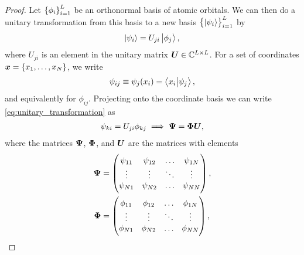             \begin{proof}
                Let $\left\{ \phi_i \right\}_{i = 1}^{L}$ be an orthonormal basis of
                atomic orbitals.
                We can then do a unitary transformation from this basis to a new
                basis $\left\{ \ket{\psi_i} \right\}_{i = 1}^{L}$ by
                \begin{align}
                    \ket{\psi_i} = U_{ji}\ket{\phi_j},
                    \label{eq:unitary_transformation}
                \end{align}
                where $U_{ji}$ is an element in the unitary matrix $\boldsymbol{U} \in
                \mathbb{C}^{L \times L}$.
                For a set of coordinates $\boldsymbol{x} = \left\{ x_1, \dots, x_N \right\}$, we
                write
                \begin{align}
                    \psi_{ij} \equiv \psi_j(x_i)
                    = \braket{x_i}{\psi_j},
                \end{align}
                and equivalently for $\phi_{ij}$. Projecting onto the coordinate
                basis we can write \autoref{eq:unitary_transformation} as
                \begin{gather}
                    \psi_{ki} = U_{ji}\phi_{kj}
                    \implies
                    \boldsymbol{\Psi} = \boldsymbol{\Phi}\boldsymbol{U},
                \end{gather}
                where the matrices $\boldsymbol{\Psi}$, $\boldsymbol{\Phi}$, and $\boldsymbol{U}$ are
                the matrices with elements
                \begin{align}
                    \vfg{\Psi}
                    &= \begin{pmatrix}
                        \psi_{11} & \psi_{12} & \dots & \psi_{1N} \\
                        \vdots & \vdots & \ddots & \vdots \\
                        \psi_{N1} & \psi_{N2} & \dots & \psi_{NN}
                    \end{pmatrix}, \\
                    \vfg{\Phi}
                    &= \begin{pmatrix}
                        \phi_{11} & \phi_{12} & \dots & \phi_{1N} \\
                        \vdots & \vdots & \ddots & \vdots \\
                        \phi_{N1} & \phi_{N2} & \dots & \phi_{NN}
                    \end{pmatrix}, \\

\end{align}
\end{proof}
